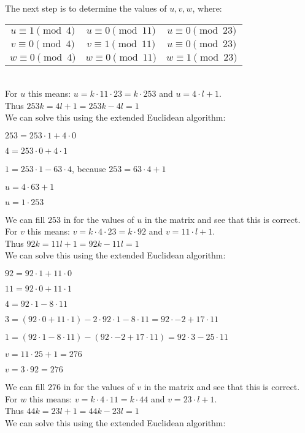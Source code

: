 \documentclass{article}
\begin{document}
The next step is to determine the values of $u, v, w$, where:

\begin{tabular}{ccc}
$u \equiv 1 \pmod{4}$ & $u \equiv 0 \pmod{11}$ & $u \equiv 0 \pmod{23}$ \\ 
$v \equiv 0 \pmod{4}$ & $v \equiv 1 \pmod{11}$ & $u \equiv 0 \pmod{23}$ \\ 
$w \equiv 0 \pmod{4}$ & $w \equiv 0 \pmod{11}$ & $w \equiv 1 \pmod{23}$ \\ 
\end{tabular} \\

For $u$ this means: $u = k \cdot 11 \cdot 23 = k \cdot 253$ and $u = 4\cdot l + 1$.\\
Thus $253k = 4l+1 = 253k - 4l = 1$\\
We can solve this using the extended Euclidean algorithm:

$253 = 253 \cdot 1 + 4 \cdot 0$

$4 = 253 \cdot 0 + 4 \cdot 1$

$1 = 253 \cdot 1 - 63 \cdot 4$, because $253 = 63 \cdot 4 + 1$

$u = 4 \cdot 63 + 1$

$u = 1 \cdot 253$

We can fill $253$ in for the values of $u$ in the matrix and see that this is correct.\\

For $v$ this means: $v = k \cdot 4 \cdot 23 = k \cdot 92$ and $v = 11\cdot l + 1$.\\
Thus $92k = 11l+1 = 92k - 11l = 1$\\
We can solve this using the extended Euclidean algorithm:

$92 = 92 \cdot 1 + 11 \cdot 0$

$11 = 92 \cdot 0 + 11 \cdot 1$

$4 = 92 \cdot 1 - 8 \cdot 11$

$3 = (92 \cdot 0 + 11 \cdot 1) - 2 \cdot 92 \cdot 1 - 8 \cdot 11 = 92 \cdot -2 + 17 \cdot 11$

$1 = (92 \cdot 1 - 8 \cdot 11) - (92 \cdot -2 + 17 \cdot 11) = 92 \cdot 3 - 25 \cdot 11$

$v = 11 \cdot 25 + 1 = 276$

$v = 3 \cdot 92 = 276$

We can fill $276$ in for the values of $v$ in the matrix and see that this is correct.\\

For $w$ this means: $v = k \cdot 4 \cdot 11 = k \cdot 44$ and $v = 23\cdot l + 1$.\\
Thus $44k = 23l+1 = 44k - 23l = 1$\\
We can solve this using the extended Euclidean algorithm:
\end{document}
